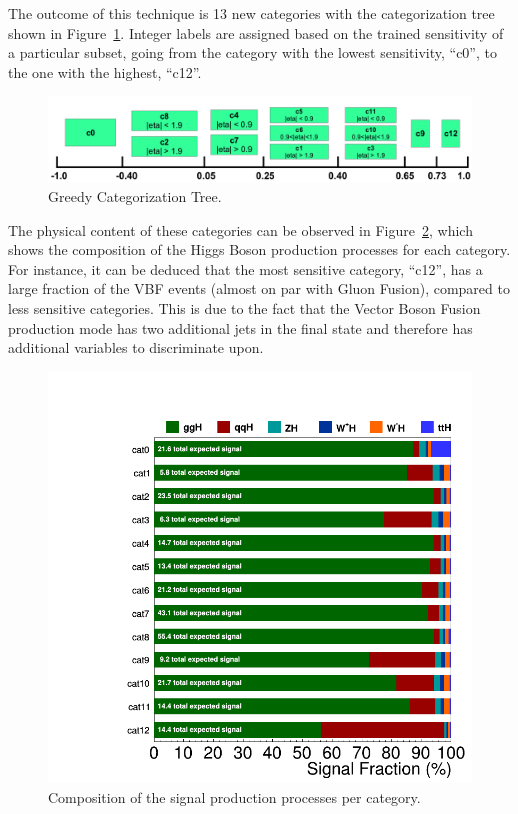 The outcome of this technique is 13 new categories with the categorization tree shown in Figure~\ref{fig:higgs_categorization_bdtcategories}. Integer labels are assigned based on the trained sensitivity of a particular subset, going from the category with the lowest sensitivity, ``c0'', to the one with the highest, ``c12''.
\begin{figure}[hbtp]
  \centering
  \includegraphics[width=1.0\linewidth]{figures/bdt_cats/final_categories.png}
  \caption{Greedy Categorization Tree.}
  \label{fig:higgs_categorization_bdtcategories}
\end{figure}

The physical content of these categories can be observed in Figure~\ref{fig:higgs_categorization_physicscontent}, which shows the composition of the Higgs Boson production processes for each category. For instance, it can be deduced that the most sensitive category, ``c12'', has a large fraction of the VBF events (almost on par with Gluon Fusion), compared to less sensitive categories. This is due to the fact that the Vector Boson Fusion production mode has two additional jets in the final state and therefore has additional variables to discriminate upon.
\begin{figure}[hbtp]
  \centering
  \includegraphics[width=0.8\linewidth]{figures/signal_model/signal_composition.png}
  \caption{Composition of the signal production processes per category.}
  \label{fig:higgs_categorization_physicscontent}
\end{figure}

